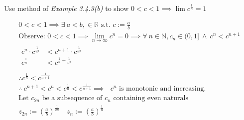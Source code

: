\documentclass[../main.tex]{subfiles}
\begin{document}
{Use method of \textit{Example 3.4.3(b)} to show $0<c<1 \implies  \lim c^{\frac{1}{n}}=1$ }

\[
\begin{gathered}
0<c<1 \implies \exists~ a < b, \in \mathbb{R} \text{ s.t. } c:= \frac{a}{b} \\
\text{Observe: } 0 < c < 1 \implies \lim_{n \to \infty} c^n = 0 \implies \forall~ n \in \mathbb{N}, c_n \in (0,1]  ~\land~ c^n < c^{n+1}\\
\begin{aligned}
c^n \cdot c^{\frac{1}{n^2}} & < c^{n+1} \cdot c^{\frac{1}{n^2}}  \\
c^{\frac{1}{n}}  & <  c^{\frac{1}{n} + \frac{1}{n^2}} \\
\end{aligned} \\
\therefore c^{\frac{1}{n}} < c^{\frac{1}{n+1}} \\
\therefore ~c^{n+1} < c^n < c^\frac{1}{n} < c^{\frac{1}{n+1}} \implies \text{ $c^n$ is monotonic and increasing.}\\
\text{Let } c_{2n} \text{ be a subsequence of $c_n$ containing even naturals} \\
z_{2n} := \left(\frac{a}{b}\right)^{\frac{1}{2n}} \quad z_n := \left(\frac{a}{b}\right) ^{\frac{1}{n}} \\
\end{gathered}
\] 
\end{document}
